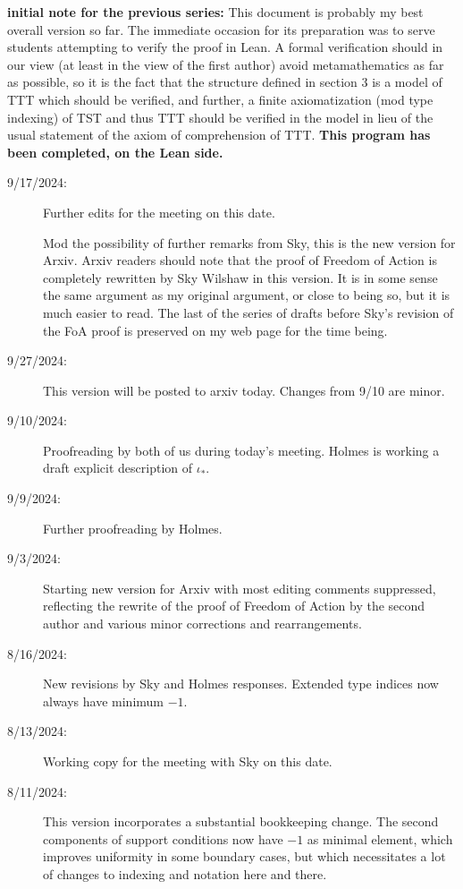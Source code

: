 \documentclass[112pt]{article}
\theoremstyle{definition}
\theoremstyle{remark}
\begin{document}
{\bf initial note for the previous series:}  This document is probably my best overall version so far.  The immediate occasion for its preparation was to serve students attempting to verify the proof in Lean.  A formal verification should in our view (at least in the view of the first author) avoid metamathematics as far as possible, so it is the fact that the structure defined in section 3 is a model of TTT which should be verified, and further, a finite axiomatization (mod type indexing) of TST and thus TTT should be verified in the model in lieu of the usual statement of the axiom of comprehension of TTT.  {\bf This program has been completed, on the Lean side.}
\begin{description}

\item[9/17/2024:]  Further edits for the meeting on this date.

Mod the possibility of further remarks from Sky, this is the new version for Arxiv.  Arxiv readers should note that the proof of Freedom of Action is completely rewritten by Sky Wilshaw in this version.  It is in some sense the same argument as my original argument, or close to being so, but it is much easier to read.  The last of the series of drafts before Sky's revision of the FoA proof is preserved on my web page for the time being.

\item[9/27/2024:]  This version will be posted to arxiv today.  Changes from 9/10 are minor.

\item[9/10/2024:]  Proofreading by both of us during today's meeting.  Holmes is working a draft explicit description of $\iota_*$.

\item[9/9/2024:]  Further proofreading by Holmes.

\item[9/3/2024:]  Starting new version for Arxiv with most editing comments suppressed, reflecting the rewrite of the proof of Freedom of Action by the second author and various minor corrections and rearrangements.

\item[8/16/2024:]  New revisions by Sky and Holmes responses.  Extended type indices now always have minimum $-1$.

\item[8/13/2024:]  Working copy for the meeting with Sky on this date.

\item[8/11/2024:]  This version incorporates a substantial bookkeeping change.  The second components of support conditions now have $-1$ as minimal element, which improves uniformity in some boundary cases, but which necessitates a lot of changes to indexing and notation here and there.


\end{description}
\end{document}
